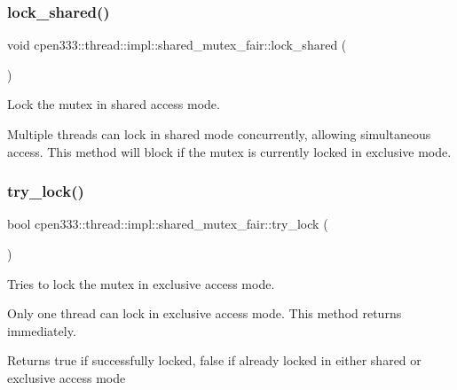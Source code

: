 \subsubsection{\texorpdfstring{lock\+\_\+shared()}{lock\_shared()}}
{\footnotesize\ttfamily void cpen333\+::thread\+::impl\+::shared\+\_\+mutex\+\_\+fair\+::lock\+\_\+shared (\begin{DoxyParamCaption}{ }\end{DoxyParamCaption})\hspace{0.3cm}{\ttfamily [inline]}}



Lock the mutex in shared access mode. 

Multiple threads can lock in shared mode concurrently, allowing simultaneous access. This method will block if the mutex is currently locked in exclusive mode. \mbox{\label{classcpen333_1_1thread_1_1impl_1_1shared__mutex__fair_aa36b18b2278011fdf6624cc61ee260a1}} 
\subsubsection{\texorpdfstring{try\+\_\+lock()}{try\_lock()}}
{\footnotesize\ttfamily bool cpen333\+::thread\+::impl\+::shared\+\_\+mutex\+\_\+fair\+::try\+\_\+lock (\begin{DoxyParamCaption}{ }\end{DoxyParamCaption})\hspace{0.3cm}{\ttfamily [inline]}}



Tries to lock the mutex in exclusive access mode. 

Only one thread can lock in exclusive access mode. This method returns immediately.

\begin{DoxyReturn}{Returns}
true if successfully locked, false if already locked in either shared or exclusive access mode 
\end{DoxyReturn}
\mbox{\label{classcpen333_1_1thread_1_1impl_1_1shared__mutex__fair_acc5fb14c1943ba33011f9c7e8562c4a9}} 

